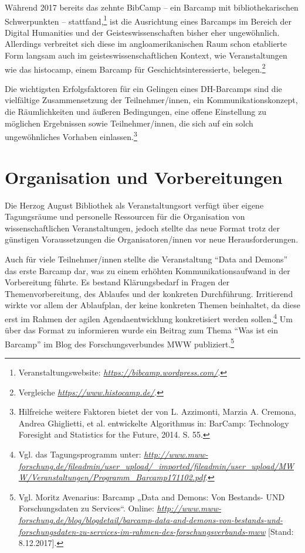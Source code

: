 \documentclass[a4paper,
fontsize=11pt,
oneside,
numbers=noperiodatend,
parskip=half-,
bibliography=totoc,
final
]{scrartcl}
\begin{document}
Während 2017 bereits das zehnte BibCamp -- ein Barcamp mit
bibliothekarischen Schwerpunkten -- stattfand,\footnote{Veranstaltungswebsite:
  \href{https://bibcamp.wordpress.com/}{\emph{https://bibcamp.wordpress.com/}}.}
ist die Ausrichtung eines Barcamps im Bereich der Digital Humanities und
der Geisteswissenschaften bisher eher ungewöhnlich. Allerdings
verbreitet sich diese im angloamerikanischen Raum schon etablierte Form
langsam auch im geisteswissenschaftlichen Kontext, wie Veranstaltungen
wie das histocamp, einem Barcamp für Geschichtsinteressierte,
belegen.\footnote{Vergleiche
  \href{https://www.histocamp.de/}{\emph{https://www.histocamp.de/}}.}

Die wichtigsten Erfolgsfaktoren für ein Gelingen eines DH-Barcamps sind
die vielfältige Zusammensetzung der Teilnehmer/innen, ein
Kommunikationskonzept, die Räumlichkeiten und äußeren Bedingungen, eine
offene Einstellung zu möglichen Ergebnissen sowie Teilnehmer/innen, die
sich auf ein solch ungewöhnliches Vorhaben einlassen.\footnote{Hilfreiche
  weitere Faktoren bietet der von L. Azzimonti, Marzia A. Cremona,
  Andrea Ghiglietti, et al. entwickelte Algorithmus in: BarCamp:
  Technology Foresight and Statistics for the Future, 2014. S. 55.}

\section{Organisation und
Vorbereitungen}\label{organisation-und-vorbereitungen}

Die Herzog August Bibliothek als Veranstaltungsort verfügt über eigene
Tagungsräume und personelle Ressourcen für die Organisation von
wissenschaftlichen Veranstaltungen, jedoch stellte das neue Format trotz
der günstigen Voraussetzungen die Organisatoren/innen vor neue
Herausforderungen.

Auch für viele Teilnehmer/innen stellte die Veranstaltung \enquote{Data
and Demons} das erste Barcamp dar, was zu einem erhöhten
Kommunikationsaufwand in der Vorbereitung führte. Es bestand
Klärungsbedarf in Fragen der Themenvorbereitung, des Ablaufes und der
konkreten Durchführung. Irritierend wirkte vor allem der Ablaufplan, der
keine konkreten Themen beinhaltet, da diese erst im Rahmen der agilen
Agendaentwicklung konkretisiert werden sollen.\footnote{Vgl. das
  Tagungsprogramm unter:
  \href{http://www.mww-forschung.de/fileadmin/user_upload/_imported/fileadmin/user_upload/MWW/Veranstaltungen/Programm_Barcamp171102.pdf}{\emph{http://www.mww-forschung.de/fileadmin/user\_upload/\_imported/fileadmin/user\_upload/MWW/Veranstaltungen/Programm\_Barcamp171102.pdf}}.}
Um über das Format zu informieren wurde ein Beitrag zum Thema
\enquote{Was ist ein Barcamp} im Blog des Forschungsverbundes MWW
publiziert.\footnote{Vgl. Moritz Avenarius: Barcamp „Data and Demons:
  Von Bestands- UND Forschungsdaten zu Services``. Online:
\href{http://www.mww-forschung.de/blog/blogdetail/barcamp-data-and-demons-von-bestands-und-forschungsdaten-zu-services-im-rahmen-des-forschungsverbunds-mww}{\emph{http://www.mww-forschung.de/blog/blogdetail/barcamp-data-and-demons-von-bestands-und-forschungsdaten-zu-services-im-rahmen-des-forschungsverbunds-mww}}
  {[}Stand: 8.12.2017{]}.}
\end{document}
